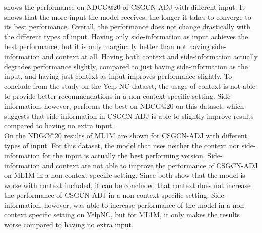  shows the performance on NDCG@20 of CSGCN-ADJ with different input.
It shows that the more input the model receives, the longer it takes to converge to its best performance.
Overall, the performance does not change drastically with the different types of input.
Having only side-information as input achieves the best performance, but it is only marginally better than not having side-information and context at all.
Having both context and side-information actually degrades performance slightly, compared to just having side-information as the input, and having just context as input improves performance slightly.
To conclude from the study on the Yelp-NC dataset, the usage of context is not able to provide better recommendations in a non-context-specific setting.
Side-information, however, performs the best on NDCG@20 on this dataset, which suggests that side-information in CSGCN-ADJ is able to slightly improve results compared to having no extra input.
\\
On  the NDGC@20 results of ML1M are shown for CSGCN-ADJ with different types of input. 
For this dataset, the model that uses neither the context nor side-information for the input is actually the best performing version.
Side-information and context are not able to improve the performance of CSGCN-ADJ on ML1M in a non-context-specific setting.
Since both  show that the model is worse with context included, it can be concluded that context does not increase the performance of CSGCN-ADJ in a non-context specific setting.
Side-information, however, was able to increase performance of the model in a non-context specific setting on YelpNC, but for ML1M, it only makes the results worse compared to having no extra input.

